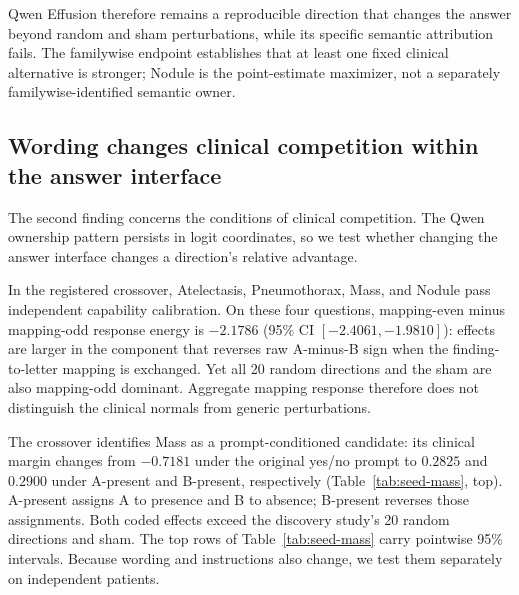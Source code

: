 \documentclass{article}
\begin{document}
Qwen Effusion therefore remains a reproducible direction that changes the answer beyond random and sham perturbations, while its specific semantic attribution fails. The familywise endpoint establishes that at least one fixed clinical alternative is stronger; Nodule is the point-estimate maximizer, not a separately familywise-identified semantic owner.

\subsection{Wording changes clinical competition within the answer interface}
\label{sec:encoding-results}

The second finding concerns the conditions of clinical competition. The Qwen ownership pattern persists in logit coordinates, so we test whether changing the answer interface changes a direction's relative advantage.

In the registered crossover, Atelectasis, Pneumothorax, Mass, and Nodule pass independent capability calibration. On these four questions, mapping-even minus mapping-odd response energy is $-2.1786$ (95\% CI $[-2.4061,-1.9810]$): effects are larger in the component that reverses raw A-minus-B sign when the finding-to-letter mapping is exchanged. Yet all 20 random directions and the sham are also mapping-odd dominant. Aggregate mapping response therefore does not distinguish the clinical normals from generic perturbations.

The crossover identifies Mass as a prompt-conditioned candidate: its clinical margin changes from $-0.7181$ under the original yes/no prompt to $0.2825$ and $0.2900$ under A-present and B-present, respectively (Table~\ref{tab:seed-mass}, top). A-present assigns A to presence and B to absence; B-present reverses those assignments. Both coded effects exceed the discovery study's 20 random directions and sham. The top rows of Table~\ref{tab:seed-mass} carry pointwise 95\% intervals. Because wording and instructions also change, we test them separately on independent patients.
\end{document}
